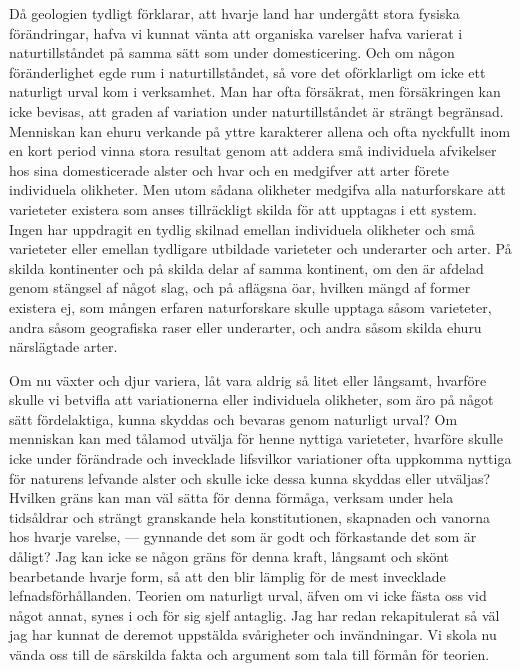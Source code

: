 Då geologien tydligt förklarar, att hvarje land har undergått stora fysiska förändringar, hafva vi kunnat vänta att organiska varelser hafva varierat i naturtillståndet på samma sätt som under domesticering. Och om någon föränderlighet egde rum i naturtillståndet, så vore det oförklarligt om icke ett naturligt urval kom i verksamhet. Man har ofta försäkrat, men försäkringen kan icke bevisas, att graden af variation under naturtillståndet är strängt begränsad. Menniskan kan ehuru verkande på yttre karakterer allena och ofta nyckfullt inom en kort period vinna stora resultat genom att addera små individuela afvikelser hos sina domesticerade alster och hvar och en medgifver att arter förete individuela olikheter. Men utom sådana olikheter medgifva alla naturforskare att varieteter existera som anses tillräckligt skilda för att upptagas i ett system. Ingen har uppdragit en tydlig skilnad emellan individuela olikheter och små varieteter eller emellan tydligare utbildade varieteter och underarter och arter. På skilda kontinenter och på skilda delar af samma kontinent, om den är afdelad genom stängsel af något slag, och på aflägsna öar, hvilken mängd af former existera ej, som mången erfaren naturforskare skulle upptaga såsom varieteter, andra såsom geografiska raser eller underarter, och andra såsom skilda ehuru närslägtade arter.

Om nu växter och djur variera, låt vara aldrig så litet eller långsamt, hvarföre skulle vi betvifla att variationerna eller individuela olikheter, som äro på något sätt fördelaktiga, kunna skyddas och bevaras genom naturligt urval? Om menniskan kan med tålamod utvälja för henne nyttiga varieteter, hvarföre skulle icke under förändrade och invecklade lifsvilkor variationer ofta uppkomma nyttiga för naturens lefvande alster och skulle icke dessa kunna skyddas eller utväljas? Hvilken gräns kan man väl sätta för denna förmåga, verksam under hela tidsåldrar och strängt granskande hela konstitutionen, skapnaden och vanorna hos hvarje varelse, — gynnande det som är godt och förkastande det som är dåligt? Jag kan icke se någon gräns för denna kraft, långsamt och skönt bearbetande hvarje form, så att den blir lämplig för de mest invecklade lefnadsförhållanden. Teorien om naturligt urval, äfven om vi icke fästa oss vid något annat, synes i och för sig sjelf antaglig. Jag har redan rekapitulerat så väl jag har kunnat de deremot uppstälda svårigheter och invändningar. Vi skola nu vända oss till de särskilda fakta och argument som tala till förmån för teorien.

